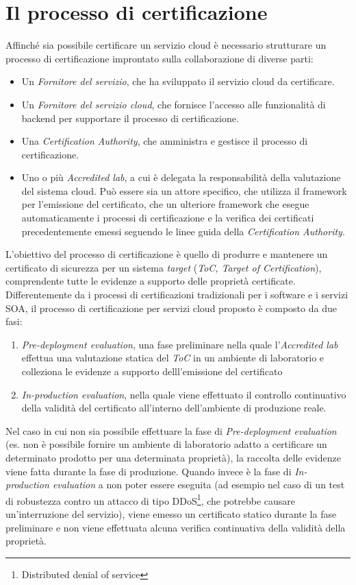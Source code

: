 \documentclass[../main.tex]{subfiles}
\begin{document}
\section{Il processo di certificazione}

Affinché sia possibile certificare un servizio cloud è necessario strutturare un processo di certificazione improntato sulla collaborazione di diverse parti\cite{Cloud1}:
\begin{itemize}
\item Un \textit{Fornitore del servizio}, che ha sviluppato il servizio cloud da certificare.
\item Un \textit{Fornitore del servizio cloud}, che fornisce l'accesso alle funzionalità di backend per supportare il processo di certificazione.
\item Una \textit{Certification Authority}, che amministra e gestisce il processo di certificazione.
\item Uno o più \textit{Accredited lab}, a cui è delegata la responsabilità della valutazione del sistema cloud. Può essere sia un attore specifico, che utilizza il framework per l'emissione del certificato, che un ulteriore framework che esegue automaticamente i processi di certificazione e la verifica dei certificati precedentemente emessi seguendo le linee guida della \textit{Certification Authority}.
\end{itemize}

L'obiettivo del processo di certificazione è quello di produrre e mantenere un certificato  di sicurezza per un sistema \textit{target} (\textit{ToC, Target of Certification}), comprendente tutte le evidenze a supporto delle proprietà certificate.\cite{Cloud1}
Differentemente da i processi di certificazioni tradizionali per i software e i servizi SOA, il processo di certificazione per servizi cloud proposto è composto da due fasi:
\begin{enumerate}
\item \textit{Pre-deployment evaluation}, una fase preliminare nella quale l'\textit{Accredited lab} effettua una valutazione statica del \textit{ToC} in un ambiente di laboratorio e colleziona le evidenze a supporto delll'emissione del certificato
\item \textit{In-production evaluation}, nella quale viene effettuato il controllo continuativo della validità del certificato all'interno dell'ambiente di produzione reale.
\end{enumerate}

Nel caso in cui non sia possibile effettuare la fase di \textit{Pre-deployment evaluation} (es. non è possibile fornire un ambiente di laboratorio adatto a certificare un determinato prodotto per una determinata proprietà), la raccolta delle evidenze viene fatta durante la fase di produzione.
Quando invece è la fase di \textit{In-production evaluation} a non poter essere eseguita (ad esempio nel caso di un test di robustezza contro un attacco di tipo DDoS\footnote{Distributed denial of service}, che potrebbe causare un'interruzione del servizio), viene emesso un certificato statico durante la fase preliminare e non viene effettuata alcuna verifica continuativa della validità della proprietà.\cite{Cloud1}
\end{document}
